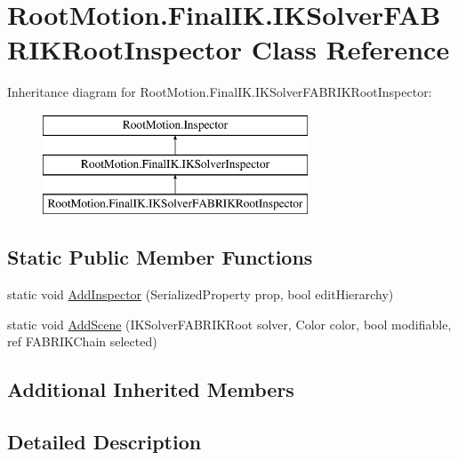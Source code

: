 \hypertarget{class_root_motion_1_1_final_i_k_1_1_i_k_solver_f_a_b_r_i_k_root_inspector}{}\section{Root\+Motion.\+Final\+I\+K.\+I\+K\+Solver\+F\+A\+B\+R\+I\+K\+Root\+Inspector Class Reference}
\label{class_root_motion_1_1_final_i_k_1_1_i_k_solver_f_a_b_r_i_k_root_inspector}
Inheritance diagram for Root\+Motion.\+Final\+I\+K.\+I\+K\+Solver\+F\+A\+B\+R\+I\+K\+Root\+Inspector\+:\begin{figure}[H]
\begin{center}
\leavevmode
\includegraphics[height=3.000000cm]{class_root_motion_1_1_final_i_k_1_1_i_k_solver_f_a_b_r_i_k_root_inspector}
\end{center}
\end{figure}
\subsection*{Static Public Member Functions}
\begin{DoxyCompactItemize}
\item 
static void \mbox{\hyperlink{class_root_motion_1_1_final_i_k_1_1_i_k_solver_f_a_b_r_i_k_root_inspector_ab547b0372e43e71f9115c24315dec1d5}{Add\+Inspector}} (Serialized\+Property prop, bool edit\+Hierarchy)
\item 
static void \mbox{\hyperlink{class_root_motion_1_1_final_i_k_1_1_i_k_solver_f_a_b_r_i_k_root_inspector_a0ecd92163796cf6a79a784d5b7466304}{Add\+Scene}} (I\+K\+Solver\+F\+A\+B\+R\+I\+K\+Root solver, Color color, bool modifiable, ref F\+A\+B\+R\+I\+K\+Chain selected)
\end{DoxyCompactItemize}
\subsection*{Additional Inherited Members}


\subsection{Detailed Description}


